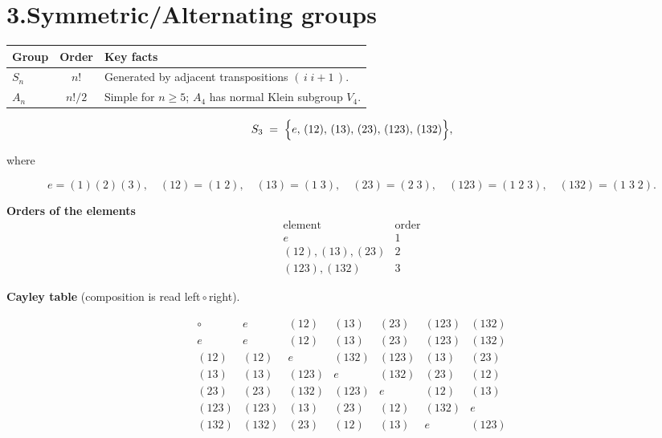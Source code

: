\documentclass[12pt]{article}
\theoremstyle{definition} %
\theoremstyle{plain} %
\begin{document}
  \section*{3.\;Symmetric/Alternating groups}
  
  \begin{tabular}{|l|c|p{7cm}|}
  \hline
  Group & Order & Key facts\\\hline
  $S_{n}$ & $n!$ & Generated by adjacent transpositions $(\,i\; i+1\,)$.\\
  $A_{n}$ & $n!/2$ & Simple for $n\ge 5$; $A_{4}$ has normal Klein subgroup $V_{4}$.\\\hline
  \end{tabular}

\begin{align*}
  S_{3}
    \;=\;
    \Bigl\{
        e,\, (12),\, (13),\, (23),\, (123),\, (132)
    \Bigr\},
  \end{align*}
  
  \noindent where  
  
  \[
     e      =(1)(2)(3),\quad
     (12)   =(1\;2),\quad
     (13)   =(1\;3),\quad
     (23)   =(2\;3),\quad
     (123)  =(1\;2\;3),\quad
     (132)  =(1\;3\;2).
  \]
  
  \smallskip
  \textbf{Orders of the elements}
  \[
  \begin{array}{c|c}
  \text{element} & \text{order}\\\hline
  e             & 1\\
  (12),(13),(23) & 2\\
  (123),(132)    & 3
  \end{array}
  \]
  
  \smallskip
  \textbf{Cayley table} (composition is read left\,\(\circ\)\,right).
  
  \[
  \renewcommand{\arraystretch}{1.25}
  \begin{array}{c|cccccc}
  \circ & e & (12) & (13) & (23) & (123) & (132)\\\hline
  e      & e & (12) & (13) & (23) & (123) & (132)\\
  (12)   & (12) & e & (132) & (123) & (13) & (23)\\
  (13)   & (13) & (123) & e & (132) & (23) & (12)\\
  (23)   & (23) & (132) & (123) & e & (12) & (13)\\
  (123)  & (123) & (13) & (23) & (12) & (132) & e\\
  (132)  & (132) & (23) & (12) & (13) & e & (123)
  \end{array}
  \]
  
\end{document}
